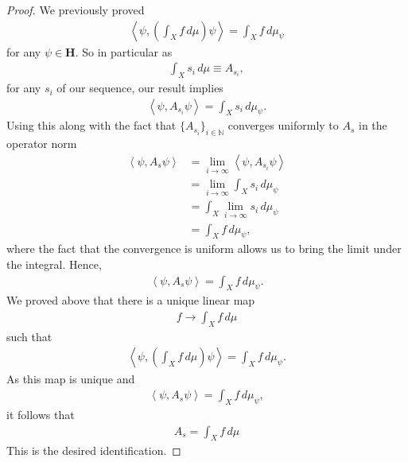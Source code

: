 \begin{proof}
We previously proved
\begin{align}
    \left< \psi, \left( \int_X f \, d\mu \right) \psi \right> = \int_X f \, d\mu_\psi
\end{align}
for any $\psi \in \mathbf{H}$. So in particular as
\begin{align}
    \int_X s_i \, d\mu \equiv A_{s_i},
\end{align}
for any $s_i$ of our sequence, our result implies
\begin{align}
    \left< \psi, A_{s_i} \psi \right> = \int_X s_i \, d\mu_\psi.
\end{align}
Using this along with the fact that $\{A_{s_i}\}_{i \in \mathbb{N}}$ converges uniformly to $A_s$ in the operator norm
\begin{align}
    \left< \psi, A_s\psi \right> &= \lim_{i \rightarrow \infty} \left< \psi, A_{s_i} \psi \right> \\
                                 &= \lim_{i \rightarrow \infty} \int_X s_i \, d\mu_\psi \\
                                 &= \int_X \lim_{i \rightarrow \infty} s_i \, d\mu_\psi \\
                                 &= \int_X f \, d\mu_\psi,
\end{align}
where the fact that the convergence is uniform allows us to bring the limit under the integral. Hence,
\begin{align}
    \left< \psi, A_s\psi \right> = \int_X f \, d\mu_\psi.
\end{align}
We proved above that there is a unique linear map
\begin{align}
    f \longrightarrow \int_X f \, d\mu
\end{align}
such that
\begin{align}
    \left< \psi, \left( \int_X f \, d\mu \right) \psi \right> = \int_X f \, d\mu_\psi.
\end{align}
As this map is unique and
\begin{align}
    \left< \psi, A_s\psi \right> = \int_X f \, d\mu_\psi,
\end{align}
it follows that
\begin{align}
    A_s = \int_X f \, d\mu
\end{align}
This is the desired identification.
\end{proof}


